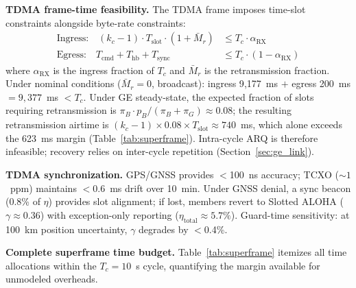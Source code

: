 \documentclass[journal]{IEEEtran}
\begin{document}
\textbf{TDMA frame-time feasibility.} The TDMA frame imposes time-slot constraints alongside byte-rate constraints:
\begin{align}
    \text{Ingress:} \quad (k_c - 1) \cdot T_{\text{slot}} \cdot (1 + \bar{M}_r) &\leq T_c \cdot \alpha_{\text{RX}} \label{eq:ingress_feasibility} \\
    \text{Egress:} \quad T_{\text{cmd}} + T_{\text{hb}} + T_{\text{sync}} &\leq T_c \cdot (1 - \alpha_{\text{RX}}) \label{eq:egress_feasibility}
\end{align}
where $\alpha_{\text{RX}}$ is the ingress fraction of $T_c$ and $\bar{M}_r$ is the retransmission fraction. Under nominal conditions ($\bar{M}_r = 0$, broadcast): ingress 9{,}177~ms $+$ egress 200~ms $= 9{,}377$~ms $< T_c$. Under GE steady-state, the expected fraction of slots requiring retransmission is $\pi_B \cdot p_B / (\pi_B + \pi_G) \approx 0.08$; the resulting retransmission airtime is $(k_c - 1) \times 0.08 \times T_{\text{slot}} \approx 740$~ms, which alone exceeds the 623~ms margin (Table~\ref{tab:superframe}). Intra-cycle ARQ is therefore infeasible; recovery relies on inter-cycle repetition (Section~\ref{sec:ge_link}).

\textbf{TDMA synchronization.} GPS/GNSS provides $<$100~ns accuracy; TCXO (${\sim}1$~ppm) maintains $<$0.6~ms drift over 10~min. Under GNSS denial, a sync beacon (0.8\% of $\eta$) provides slot alignment; if lost, members revert to Slotted ALOHA ($\gamma \approx 0.36$) with exception-only reporting ($\eta_{\text{total}} \approx 5.7\%$). Guard-time sensitivity: at 100~km position uncertainty, $\gamma$ degrades by $<$0.4\%.

\textbf{Complete superframe time budget.} Table~\ref{tab:superframe} itemizes all time allocations within the $T_c = 10$~s cycle, quantifying the margin available for unmodeled overheads.
\end{document}
